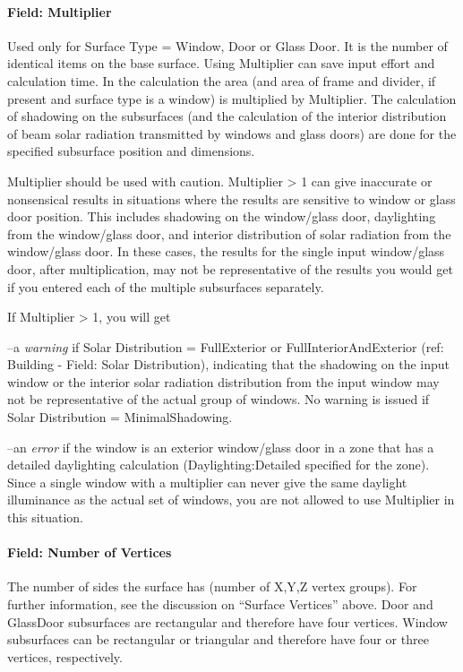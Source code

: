\paragraph{Field: Multiplier}\label{field-multiplier-7}

Used only for Surface Type = Window, Door or Glass Door. It is the number of identical items on the base surface. Using Multiplier can save input effort and calculation time. In the calculation the area (and area of frame and divider, if present and surface type is a window) is multiplied by Multiplier. The calculation of shadowing on the subsurfaces (and the calculation of the interior distribution of beam solar radiation transmitted by windows and glass doors) are done for the specified subsurface position and dimensions.

Multiplier should be used with caution. Multiplier \textgreater{} 1 can give inaccurate or nonsensical results in situations where the results are sensitive to window or glass door position. This includes shadowing on the window/glass door, daylighting from the window/glass door, and interior distribution of solar radiation from the window/glass door. In these cases, the results for the single input window/glass door, after multiplication, may not be representative of the results you would get if you entered each of the multiple subsurfaces separately.

If Multiplier \textgreater{} 1, you will get

--a \emph{warning} if Solar Distribution = FullExterior or FullInteriorAndExterior (ref: Building - Field: Solar Distribution), indicating that the shadowing on the input window or the interior solar radiation distribution from the input window may not be representative of the actual group of windows. No warning is issued if Solar Distribution = MinimalShadowing.

--an \emph{error} if the window is an exterior window/glass door in a zone that has a detailed daylighting calculation (Daylighting:Detailed specified for the zone). Since a single window with a multiplier can never give the same daylight illuminance as the actual set of windows, you are not allowed to use Multiplier in this situation.

\paragraph{Field: Number of Vertices}\label{field-number-of-vertices-4}

The number of sides the surface has (number of X,Y,Z vertex groups). For further information, see the discussion on ``Surface Vertices'' above. Door and GlassDoor subsurfaces are rectangular and therefore have four vertices. Window subsurfaces can be rectangular or triangular and therefore have four or three vertices, respectively.

